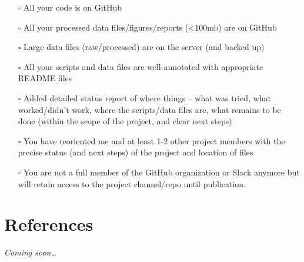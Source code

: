 \documentclass[
  letterpaper,
  DIV=11,
  numbers=noendperiod]{scrreprt}
\newlength{\cslhangindent}
\newlength{\cslentryspacingunit} %
\newenvironment{CSLReferences}[2] %
 {%
  \setlength{\parindent}{0pt}
  \ifodd #1
  \let\oldpar\par
  \def\par{\hangindent=\cslhangindent\oldpar}
  \fi
  \setlength{\parskip}{#2\cslentryspacingunit}
 }%
 {}
\begin{document}
\begin{itemize}
\item[$\square$]
  All your code is on GitHub
\item[$\square$]
  All your processed data files/figures/reports (\textless100mb) are on
  GitHub
\item[$\square$]
  Large data files (raw/processed) are on the server (and backed up)
\item[$\square$]
  All your scripts and data files are well-annotated with appropriate
  README files
\item[$\square$]
  Added detailed status report of where things -- what was tried, what
  worked/didn't work, where the scripts/data files are, what remains to
  be done (within the scope of the project, and clear next steps)
\item[$\square$]
  You have reoriented me and at least 1-2 other project members with the
  precise status (and next steps) of the project and location of files
\item[$\square$]
  You are not a full member of the GitHub organization or Slack anymore
  but will retain access to the project channel/repo until publication.
\end{itemize}


\hypertarget{references}{%
\chapter*{References}\label{references}}

\hypertarget{refs}{}
\begin{CSLReferences}{0}{0}
\end{CSLReferences}

\emph{Coming soon\ldots{}}
\end{document}
